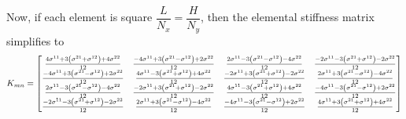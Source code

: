Now, if each element is square \ie $\dfrac{L}{N_{x}}=\dfrac{H}{N_{y}}$, then the elemental stiffness matrix simplifies to
\begin{equation}
  K_{mn}=\begin{bmatrix}
  \frac{4\conductivitytensorsymbol^{11}+3\pbrac{\conductivitytensorsymbol^{21}+
      \conductivitytensorsymbol^{12}}+4\conductivitytensorsymbol^{22}}{12} &
  \frac{-4\conductivitytensorsymbol^{11}+3\pbrac{\conductivitytensorsymbol^{21}-
      \conductivitytensorsymbol^{12}}+2\conductivitytensorsymbol^{22}}{12} &
  \frac{2\conductivitytensorsymbol^{11}-3\pbrac{\conductivitytensorsymbol^{21}-
      \conductivitytensorsymbol^{12}}-4\conductivitytensorsymbol^{22}}{12} &
  \frac{-2\conductivitytensorsymbol^{11}-3\pbrac{\conductivitytensorsymbol^{21}+
        \conductivitytensorsymbol^{12}}-2\conductivitytensorsymbol^{22}}{12} \\
  \frac{-4\conductivitytensorsymbol^{11}+3\pbrac{\conductivitytensorsymbol^{21}-
      \conductivitytensorsymbol^{12}}+2\conductivitytensorsymbol^{22}}{12} &
  \frac{4\conductivitytensorsymbol^{11}-3\pbrac{\conductivitytensorsymbol^{21}+
      \conductivitytensorsymbol^{12}}+4\conductivitytensorsymbol^{22}}{12} &
  \frac{-2\conductivitytensorsymbol^{11}+3\pbrac{\conductivitytensorsymbol^{21}+
        \conductivitytensorsymbol^{12}}-2\conductivitytensorsymbol^{22}}{12} &
  \frac{2\conductivitytensorsymbol^{11}+3\pbrac{\conductivitytensorsymbol^{21}-
        \conductivitytensorsymbol^{12}}-4\conductivitytensorsymbol^{22}}{12} \\
  \frac{2\conductivitytensorsymbol^{11}-3\pbrac{\conductivitytensorsymbol^{21}-
      \conductivitytensorsymbol^{12}}-4\conductivitytensorsymbol^{22}}{12} &
  \frac{-2\conductivitytensorsymbol^{11}+3\pbrac{\conductivitytensorsymbol^{21}+
        \conductivitytensorsymbol^{12}}-2\conductivitytensorsymbol^{22}}{12} &
  \frac{4\conductivitytensorsymbol^{11}-3\pbrac{\conductivitytensorsymbol^{21}+
      \conductivitytensorsymbol^{12}}+4\conductivitytensorsymbol^{22}}{12} &
  \frac{-4\conductivitytensorsymbol^{11}-3\pbrac{\conductivitytensorsymbol^{21}-
      \conductivitytensorsymbol^{12}}+2\conductivitytensorsymbol^{22}}{12} \\
  \frac{-2\conductivitytensorsymbol^{11}-3\pbrac{\conductivitytensorsymbol^{21}+
        \conductivitytensorsymbol^{12}}-2\conductivitytensorsymbol^{22}}{12} &
  \frac{2\conductivitytensorsymbol^{11}+3\pbrac{\conductivitytensorsymbol^{21}-
        \conductivitytensorsymbol^{12}}-4\conductivitytensorsymbol^{22}}{12}&
  \frac{-4\conductivitytensorsymbol^{11}-3\pbrac{\conductivitytensorsymbol^{21}-
      \conductivitytensorsymbol^{12}}+2\conductivitytensorsymbol^{22}}{12} &
  \frac{4\conductivitytensorsymbol^{11}+3\pbrac{\conductivitytensorsymbol^{21}+
      \conductivitytensorsymbol^{12}}+4\conductivitytensorsymbol^{22}}{12}
  \end{bmatrix}
  \label{eqn:FEMTwoDGenLaplaceSquareElementStiffnessMatrix}
\end{equation}
